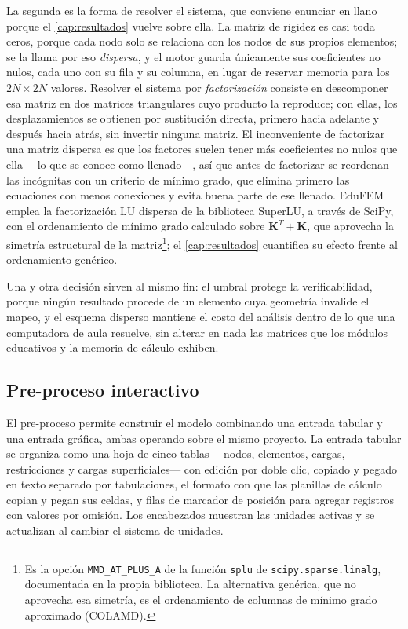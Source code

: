 La segunda es la forma de resolver el sistema, que conviene enunciar en llano porque el \autoref{cap:resultados} vuelve sobre ella. La matriz de rigidez es casi toda ceros, porque cada nodo solo se relaciona con los nodos de sus propios elementos; se la llama por eso \emph{dispersa}, y el motor guarda únicamente sus coeficientes no nulos, cada uno con su fila y su columna, en lugar de reservar memoria para los $2N \times 2N$ valores. Resolver el sistema por \emph{factorización} consiste en descomponer esa matriz en dos matrices triangulares cuyo producto la reproduce; con ellas, los desplazamientos se obtienen por sustitución directa, primero hacia adelante y después hacia atrás, sin invertir ninguna matriz. El inconveniente de factorizar una matriz dispersa es que los factores suelen tener más coeficientes no nulos que ella —lo que se conoce como llenado—, así que antes de factorizar se reordenan las incógnitas con un criterio de mínimo grado, que elimina primero las ecuaciones con menos conexiones y evita buena parte de ese llenado. EduFEM emplea la factorización LU dispersa de la biblioteca SuperLU, a través de SciPy, con el ordenamiento de mínimo grado calculado sobre $\bm{K}^{T}+\bm{K}$, que aprovecha la simetría estructural de la matriz\footnote{Es la opción \texttt{MMD\_AT\_PLUS\_A} de la función \texttt{splu} de \texttt{scipy.sparse.linalg}, documentada en la propia biblioteca. La alternativa genérica, que no aprovecha esa simetría, es el ordenamiento de columnas de mínimo grado aproximado (COLAMD).}; el \autoref{cap:resultados} cuantifica su efecto frente al ordenamiento genérico.

Una y otra decisión sirven al mismo fin: el umbral protege la verificabilidad, porque ningún resultado procede de un elemento cuya geometría invalide el mapeo, y el esquema disperso mantiene el costo del análisis dentro de lo que una computadora de aula resuelve, sin alterar en nada las matrices que los módulos educativos y la memoria de cálculo exhiben.

\subsection{Pre-proceso interactivo}
\label{sec:pre-proceso}

El pre-proceso permite construir el modelo combinando una entrada tabular y una entrada gráfica, ambas operando sobre el mismo proyecto. La entrada tabular se organiza como una hoja de cinco tablas —nodos, elementos, cargas, restricciones y cargas superficiales— con edición por doble clic, copiado y pegado en texto separado por tabulaciones, el formato con que las planillas de cálculo copian y pegan sus celdas, y filas de marcador de posición para agregar registros con valores por omisión. Los encabezados muestran las unidades activas y se actualizan al cambiar el sistema de unidades.

